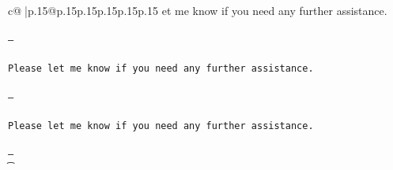 \documentclass{article}
\begin{document}
{\begin{supertabular}{c@{$\;$}|p{.15\linewidth}@{}p{.15\linewidth}p{.15\linewidth}p{.15\linewidth}p{.15\linewidth}p{.15\linewidth}}
{{{et me know if you need any further assistance. \\ \tt \\ \tt ---\\ \tt \\ \tt Please let me know if you need any further assistance. \\ \tt \\ \tt ---\\ \tt \\ \tt Please let me know if you need any further assistance. \\ \tt \\ \tt ---\\ \t}}}
\end{supertabular}}
\end{document}
